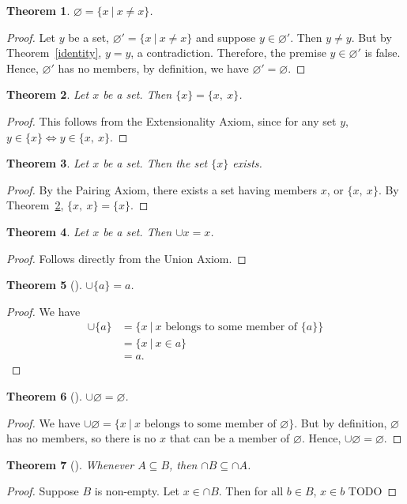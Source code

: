 \documentclass[12pt]{article}
\theoremstyle{plain}
\newtheorem{thm}{Theorem}[section]
\theoremstyle{remark}
\theoremstyle{definition}
\theoremstyle{remark}
\newcommand{\thmproof}[3]{%
\begin{thm}[#1]
#2
\end{thm}
\begin{proof}
#3
\end{proof}
}
\begin{document}
\begin{thm}
$\varnothing = \{x\ |\ x \neq x\}$.
\end{thm}
\begin{proof}
Let $y$ be a set, $\varnothing' = \{x\ |\ x \neq x\}$ and suppose $y \in \varnothing'$. Then $y \neq y$. But by Theorem~\ref{identity}, $y = y$, a contradiction. Therefore, the premise $y \in \varnothing'$ is false. Hence, $\varnothing'$ has no members, by definition, we have $\varnothing' = \varnothing$.
\end{proof}

\begin{thm}\label{multi}
Let $x$ be a set. Then $\{x\} = \{x,\ x\}$.
\end{thm}
\begin{proof}
This follows from the Extensionality Axiom, since for any set $y$, $y \in \{x\} \Leftrightarrow y \in \{x,\ x\}$.
\end{proof}

\begin{thm}
Let $x$ be a set. Then the set $\{x\}$ exists.
\end{thm}
\begin{proof}
By the Pairing Axiom, there exists a set having members $x$, or $\{x,\ x\}$. By Theorem~\ref{multi}, $\{x,\ x\} = \{x\}$.
\end{proof}

\begin{thm}
Let $x$ be a set. Then $\cup x = x$.
\end{thm}
\begin{proof}
Follows directly from the Union Axiom.
\end{proof}

\thmproof{}{$\cup{\{a\}} = a$.}
{We have
\begin{align*}
\cup{\{a\}} &= \{x\ |\ \text{$x$ belongs to some member of $\{a\}$}\}\\
&= \{x\ |\ x \in a\}\\
&= a.
\end{align*}
}

\thmproof{}{$\cup \varnothing = \varnothing$.}
{We have $\cup \varnothing = \{x\ |\ \text{$x$ belongs to some member of $\varnothing$}\}$. But by definition, $\varnothing$ has no members, so there is no $x$ that can be a member of $\varnothing$. Hence, $\cup \varnothing = \varnothing$.
}

\thmproof{}{Whenever $A \subseteq B$, then $\cap B \subseteq \cap A$.}
{Suppose $B$ is non-empty. Let $x \in \cap B$. Then for all $b \in B$, $x \in b$ TODO
}
\end{document}
